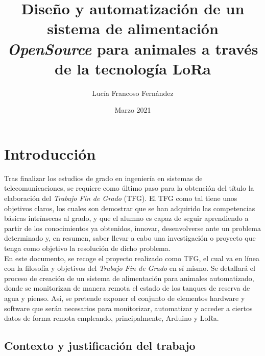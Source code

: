 \documentclass[12pt]{article}
\begin{document}

	\title{Diseño y automatización de un sistema de alimentación \textit{OpenSource} para animales a través de la tecnología LoRa}
	\author{Lucía Francoso Fernández}
	\date{Marzo 2021}
	
	\maketitle
	\pagebreak
	
	\tableofcontents
	
	\pagebreak

	\listoffigures

	\listoftables
	
	\section[Introducción]{Introducción} %
	
	Tras finalizar los estudios de grado en ingeniería en sistemas de telecomunicaciones, se requiere como último paso para la obtención del título la elaboración del \textit{Trabajo Fin de Grado} (TFG). 
	El TFG como tal tiene unos objetivos claros, los cuales son demostrar que se han adquirido las competencias básicas intrínsecas al grado, y que el alumno es capaz de seguir aprendiendo a partir de los conocimientos ya obtenidos, innovar, desenvolverse ante un problema determinado y, en resumen, saber llevar a cabo una investigación o proyecto que tenga como objetivo la resolución de dicho problema. \\
	
	\noindent En este documento, se recoge el proyecto realizado como TFG,  el cual va en línea con la filosofía y objetivos del \textit{Trabajo Fin de Grado} en sí mismo. Se detallará el proceso de creación de un sistema de alimentación para animales automatizado, donde se monitorizan de manera remota el estado de los tanques de reserva de agua y pienso. Así, se pretende exponer el conjunto de elementos hardware y software que serán necesarios para monitorizar, automatizar y acceder a ciertos datos de forma remota empleando, principalmente, Arduino y LoRa.\\
	
	
	\subsection[Contexto y justificación del trabajo]{Contexto y justificación del trabajo}
\end{document}
